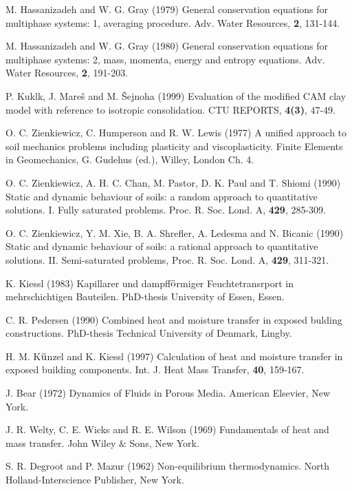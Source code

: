 \begin{thebibliography}{99}
M. Hassanizadeh and W. G. Gray (1979) General conservation equations for multiphase systems: 1, averaging procedure.
Adv. Water Resources, {\bf 2}, 131-144.

M. Hassanizadeh and W. G. Gray (1980) 
General conservation equations for multiphase systems: 2, mass, momenta, energy and entropy equations.
Adv.  Water Resources, {\bf 2}, 191-203.

P. Kukl\ii k, J. Mare\v{s} and M. \v{S}ejnoha (1999)
Evaluation of the modified CAM clay model with reference to isotropic consolidation.
CTU REPORTS, {\bf 4(3)}, 47-49.

O. C. Zienkiewicz, C. Humperson and R. W. Lewis (1977)
A unified approach to soil mechanics problems including plasticity and viscoplasticity. 
Finite Elements in Geomechanics, G. Gudehus (ed.), Willey, London Ch. 4.

O. C. Zienkiewicz, A. H. C. Chan, M. Pastor, D. K. Paul and T. Shiomi (1990)
Static and dynamic behaviour of soils: a random approach to quantitative solutions. I. Fully saturated problems.
Proc. R. Soc. Lond. A, {\bf 429}, 285-309.

O. C. Zienkiewicz, Y. M. Xie, B. A. Shrefler, A. Ledesma and N. Bicanic (1990)
Static and dynamic behaviour of soils: a rational approach to quantitative solutions.
II. Semi-saturated problems, Proc. R. Soc. Lond. A, {\bf 429}, 311-321.

K. Kiessl (1983) Kapillarer und dampff${\rm\ddot{o}}$rmiger Feuchtetransrport in mehrschichtigen Bauteilen. PhD-thesis
University of Essen, Essen.

C. R. Pedersen (1990) Combined heat and moisture transfer in exposed bulding constructions. PhD-thesis
Technical University of Denmark, Lingby.

H. M. K${\rm\ddot{u}}$nzel and K. Kiessl (1997) 
Calculation of heat and moisture transfer in exposed building components.
Int. J. Heat Mass Transfer, {\bf 40}, 159-167.

J. Bear (1972) Dynamics of Fluids in Porous Media. American Elsevier, New York.

J. R. Welty, C. E. Wicks and R. E. Wilson (1969) Fundamentals of heat and mass transfer.
John Wiley \& Sons, New York.

S. R. Degroot and P. Mazur (1962) Non-equilibrium thermodynamics.
North Holland-Interscience Publisher, New York.


\end{thebibliography}
